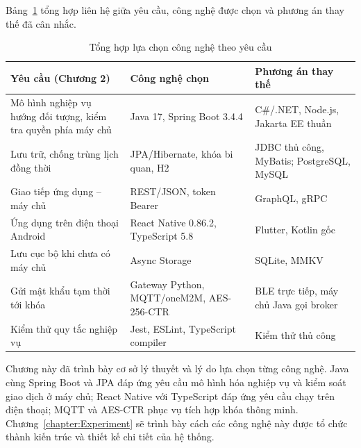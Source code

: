 \documentclass[../DoAn.tex]{subfiles}
\begin{document}
Bảng~\ref{tab:congnghe} tổng hợp liên hệ giữa yêu cầu, công nghệ được chọn và phương án thay thế đã cân nhắc.

\begin{table}[H]
\centering\small
\renewcommand{\arraystretch}{1.2}
\caption{Tổng hợp lựa chọn công nghệ theo yêu cầu}
\label{tab:congnghe}
\begin{tabularx}{\textwidth}{|p{4.2cm}|p{3.9cm}|X|}
\hline
\textbf{Yêu cầu (Chương 2)} & \textbf{Công nghệ chọn} & \textbf{Phương án thay thế} \\ \hline
Mô hình nghiệp vụ hướng đối tượng, kiểm tra quyền phía máy chủ & Java 17, Spring Boot 3.4.4 & C\#/.NET, Node.js, Jakarta EE thuần \\ \hline
Lưu trữ, chống trùng lịch đồng thời & JPA/Hibernate, khóa bi quan, H2 & JDBC thủ công, MyBatis; PostgreSQL, MySQL \\ \hline
Giao tiếp ứng dụng -- máy chủ & REST/JSON, token Bearer & GraphQL, gRPC \\ \hline
Ứng dụng trên điện thoại Android & React Native 0.86.2, TypeScript 5.8 & Flutter, Kotlin gốc \\ \hline
Lưu cục bộ khi chưa có máy chủ & Async Storage & SQLite, MMKV \\ \hline
Gửi mật khẩu tạm thời tới khóa & Gateway Python, MQTT/oneM2M, AES-256-CTR & BLE trực tiếp, máy chủ Java gọi broker \\ \hline
Kiểm thử quy tắc nghiệp vụ & Jest, ESLint, TypeScript compiler & Kiểm thử thủ công \\ \hline
\end{tabularx}
\end{table}

Chương này đã trình bày cơ sở lý thuyết và lý do lựa chọn từng công nghệ. Java cùng Spring Boot và JPA đáp ứng yêu cầu mô hình hóa nghiệp vụ và kiểm soát giao dịch ở máy chủ; React Native với TypeScript đáp ứng yêu cầu chạy trên điện thoại; MQTT và AES-CTR phục vụ tích hợp khóa thông minh. Chương~\ref{chapter:Experiment} sẽ trình bày cách các công nghệ này được tổ chức thành kiến trúc và thiết kế chi tiết của hệ thống.
\end{document}
